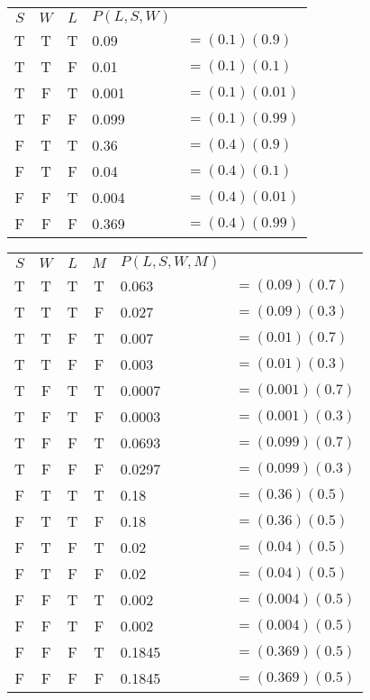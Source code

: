 \documentclass[fleqn]{hw7}
\begin{document}
\begin{enumerate}
\begin{tabular}{ccc|ll}
	$S$ & $W$ & $L$ & $P(L,S,W)$ & \\ 
	\cline{1-4}
	T   & T & T & 0.09 & $ =(0.1)(0.9) $\\
	T   & T & F & 0.01 & $ =(0.1)(0.1) $\\
	T   & F & T & 0.001 & $ =(0.1)(0.01) $\\
	T   & F & F & 0.099 & $ =(0.1)(0.99) $\\	
	F   & T & T & 0.36 & $ =(0.4)(0.9) $\\
	F   & T & F & 0.04 & $ =(0.4)(0.1) $\\	
	F   & F & T & 0.004 & $ =(0.4)(0.01) $\\
	F   & F & F & 0.369 & $ =(0.4)(0.99) $	
\end{tabular}

\begin{tabular}{cccc|ll}
	$S$ & $W$ & $L$ & $M$ & $P(L,S,W,M)$ & \\ 
	\cline{1-5}
	T   & T & T & T & 0.063 &$ =(0.09)(0.7) $\\
	T   & T & T & F & 0.027 &$ =(0.09)(0.3) $\\
	T   & T & F & T & 0.007 &$ =(0.01)(0.7) $\\
	T   & T & F & F & 0.003 &$ =(0.01)(0.3) $\\
	T   & F & T & T & 0.0007 &$ =(0.001)(0.7) $\\
	T   & F & T & F & 0.0003 &$ =(0.001)(0.3) $\\
	T   & F & F & T & 0.0693 &$ =(0.099)(0.7) $\\	
	T   & F & F & F & 0.0297 &$ =(0.099)(0.3) $\\
	F   & T & T & T & 0.18 &$ =(0.36)(0.5) $\\
	F   & T & T & F & 0.18 &$ =(0.36)(0.5) $\\
	F   & T & F & T & 0.02 &$ =(0.04)(0.5) $\\	
	F   & T & F & F & 0.02 &$ =(0.04)(0.5) $\\	
	F   & F & T & T & 0.002 &$ =(0.004)(0.5) $\\
	F   & F & T & F & 0.002 &$ =(0.004)(0.5) $\\
	F   & F & F & T & 0.1845 &$ =(0.369)(0.5) $\\	
	F   & F & F & F & 0.1845 &$ =(0.369)(0.5) $	
\end{tabular}


\end{enumerate}
\end{document}
